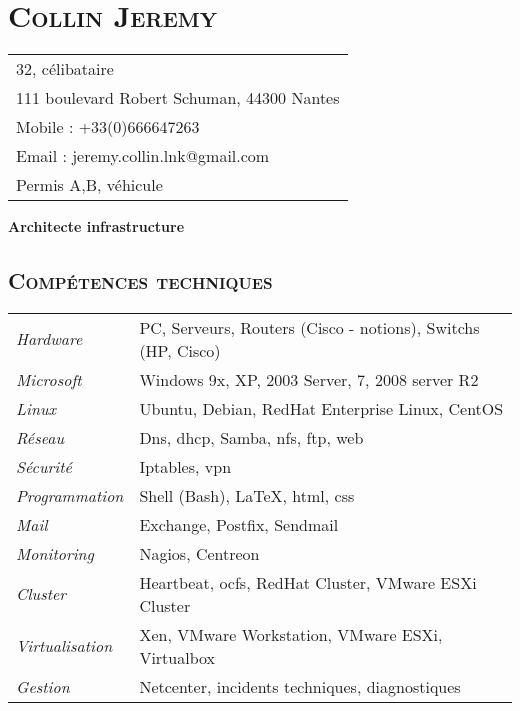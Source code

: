 \documentclass[a4paper,8pt]{article}
\newcommand{\hsection}[1]{\section*{\fontfamily{phv}\selectfont\textsc{#1}}}
\newcommand{\hsubsection}[1]{\subsection*{\fontfamily{phv}\selectfont\textsc{#1}}}
\begin{document}
\selectfont
\hsection{Collin Jeremy}
\begin{tabular}{p{16.5cm}}
\hline
32, célibataire\\
111 boulevard Robert Schuman, 44300 Nantes\\
Mobile : +33(0)666647263\\
Email : jeremy.collin.lnk@gmail.com\\
Permis A,B, véhicule\\
\end{tabular}
\begin{center}
\textbf{{\Large Architecte infrastructure}}
\end{center}

\hsubsection{Compétences techniques}
\begin{tabular}{P{3.5cm}|p{13cm}}
\textsl{Hardware}		& PC, Serveurs, Routers (Cisco - notions), Switchs (HP, Cisco)\\
\textsl{Microsoft}		& Windows 9x, XP, 2003 Server, 7, 2008 server R2\\
\textsl{Linux}			& Ubuntu, Debian, RedHat Enterprise Linux, CentOS\\
\textsl{Réseau}			& Dns, dhcp, Samba, nfs, ftp, web\\
\textsl{Sécurité}		& Iptables, vpn\\
\textsl{Programmation}		& Shell (Bash), \LaTeX, html, css\\
\textsl{Mail}			& Exchange, Postfix, Sendmail\\
\textsl{Monitoring}		& Nagios, Centreon\\
\textsl{Cluster}		& Heartbeat, ocfs, RedHat Cluster, VMware ESXi Cluster\\
\textsl{Virtualisation}		& Xen, VMware Workstation, VMware ESXi, Virtualbox\\
\textsl{Gestion}		& Netcenter, incidents techniques, diagnostiques\\
\end{tabular}
\end{document}
